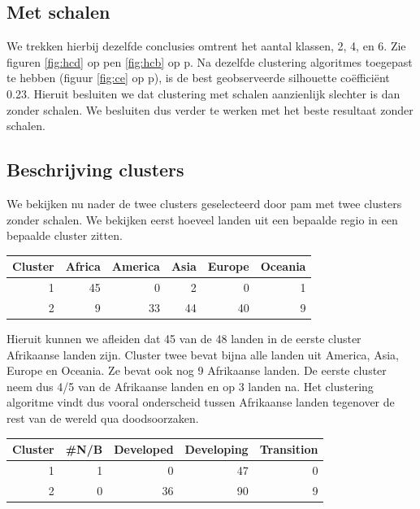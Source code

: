 \documentclass[a4paper,kulak]{kulakarticle}
\begin{document}
\subsection{Met schalen}
 We trekken hierbij dezelfde conclusies omtrent het aantal klassen, 2, 4, en 6.
 Zie figuren \ref{fig:hcd} op p\pageref{fig:hcd}en \ref{fig:hcb} op p\pageref{fig:hcb}.
 Na dezelfde clustering algoritmes toegepast te hebben (figuur \ref{fig:ce} op p\pageref{fig:ce}), is de best geobserveerde silhouette coëfficiënt 0.23.
 Hieruit besluiten we dat clustering met schalen aanzienlijk slechter is dan zonder schalen.
 We besluiten dus verder te werken met het beste resultaat zonder schalen.
\subsection{Beschrijving clusters}
We bekijken nu nader de twee clusters geselecteerd door pam met twee clusters zonder schalen.
We bekijken eerst hoeveel landen uit een bepaalde regio in een bepaalde cluster zitten.
\begin{table}[ht]
\centering
\begin{tabular}{rrrrrr}
  \hline
 Cluster & Africa & America & Asia & Europe & Oceania \\ 
  \hline
1 &  45 &   0 &   2 &   0 &   1 \\ 
  2 &   9 &  33 &  44 &  40 &   9 \\ 
   \hline
\end{tabular}
\end{table}

Hieruit kunnen we afleiden dat 45 van de 48 landen in de eerste cluster Afrikaanse landen zijn.
Cluster twee bevat bijna alle landen uit America, Asia, Europe en Oceania.
Ze bevat ook nog 9 Afrikaanse landen.
De eerste cluster neem dus 4/5 van de Afrikaanse landen en op 3 landen na.
Het clustering algoritme vindt dus vooral onderscheid tussen Afrikaanse landen tegenover de rest van de wereld qua doodsoorzaken.

\begin{table}[ht]
\centering
\begin{tabular}{rrrrr}
  \hline
 Cluster & \#N/B & Developed & Developing & Transition \\
  \hline
1 &   1 &   0 &  47 &   0 \\
  2 &   0 &  36 &  90 &   9 \\
   \hline
\end{tabular}
\end{table}
\end{document}
